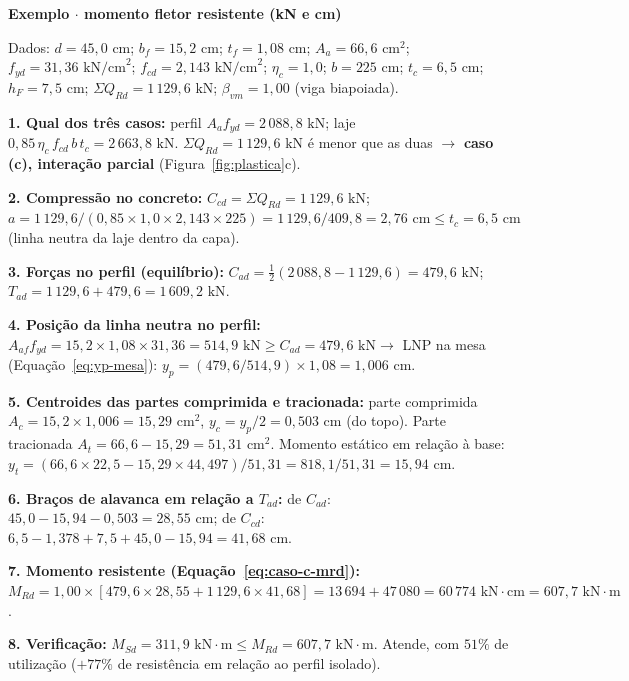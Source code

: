 \documentclass[11pt,a4paper]{article}
\newcommand{\caixaexemplo}[2]{%
  \par\vspace{6pt}\noindent\colorbox{examplebg}{%
    \parbox{\dimexpr\linewidth-2\fboxsep\relax}{%
      \vspace{4pt}\textbf{\color{exampleaccent}#1}\par\vspace{3pt}#2\vspace{4pt}%
    }%
  }\par\vspace{6pt}%
}
\begin{document}
\caixaexemplo{Exemplo $\cdot$ momento fletor resistente (kN e cm)}{%
Dados: $d = 45{,}0\text{ cm}$; $b_f = 15{,}2\text{ cm}$; $t_f = 1{,}08\text{ cm}$; $A_a = 66{,}6\text{ cm}^2$; $f_{yd} = 31{,}36\text{ kN/cm}^2$; $f_{cd} = 2{,}143\text{ kN/cm}^2$; $\eta_c = 1{,}0$; $b = 225\text{ cm}$; $t_c = 6{,}5\text{ cm}$; $h_F = 7{,}5\text{ cm}$; $\Sigma Q_{Rd} = 1\,129{,}6\text{ kN}$; $\beta_{vm} = 1{,}00$ (viga biapoiada).\par\vspace{3pt}
\textbf{1. Qual dos três casos:} perfil $A_a f_{yd} = 2\,088{,}8\text{ kN}$; laje $0{,}85\,\eta_c\,f_{cd}\,b\,t_c = 2\,663{,}8\text{ kN}$. $\Sigma Q_{Rd} = 1\,129{,}6\text{ kN}$ é menor que as duas $\rightarrow$ \textbf{caso (c), interação parcial} (Figura~\ref{fig:plastica}c).\par
\textbf{2. Compressão no concreto:} $C_{cd} = \Sigma Q_{Rd} = 1\,129{,}6\text{ kN}$; $a = 1\,129{,}6/(0{,}85 \times 1{,}0 \times 2{,}143 \times 225) = 1\,129{,}6/409{,}8 = 2{,}76\text{ cm} \le t_c = 6{,}5\text{ cm}$ (linha neutra da laje dentro da capa).\par
\textbf{3. Forças no perfil (equilíbrio):} $C_{ad} = \frac{1}{2}(2\,088{,}8 - 1\,129{,}6) = 479{,}6\text{ kN}$; $T_{ad} = 1\,129{,}6 + 479{,}6 = 1\,609{,}2\text{ kN}$.\par
\textbf{4. Posição da linha neutra no perfil:} $A_{af} f_{yd} = 15{,}2 \times 1{,}08 \times 31{,}36 = 514{,}9\text{ kN} \ge C_{ad} = 479{,}6\text{ kN} \rightarrow$ LNP na mesa (Equação~\ref{eq:yp-mesa}): $y_p = (479{,}6/514{,}9) \times 1{,}08 = 1{,}006\text{ cm}$.\par
\textbf{5. Centroides das partes comprimida e tracionada:} parte comprimida $A_c = 15{,}2 \times 1{,}006 = 15{,}29\text{ cm}^2$, $y_c = y_p/2 = 0{,}503\text{ cm}$ (do topo). Parte tracionada $A_t = 66{,}6 - 15{,}29 = 51{,}31\text{ cm}^2$. Momento estático em relação à base: $y_t = (66{,}6 \times 22{,}5 - 15{,}29 \times 44{,}497)/51{,}31 = 818{,}1/51{,}31 = 15{,}94\text{ cm}$.\par
\textbf{6. Braços de alavanca em relação a $T_{ad}$:} de $C_{ad}$: $45{,}0 - 15{,}94 - 0{,}503 = 28{,}55\text{ cm}$; de $C_{cd}$: $6{,}5 - 1{,}378 + 7{,}5 + 45{,}0 - 15{,}94 = 41{,}68\text{ cm}$.\par
\textbf{7. Momento resistente (Equação~\ref{eq:caso-c-mrd}):} $M_{Rd} = 1{,}00 \times [479{,}6 \times 28{,}55 + 1\,129{,}6 \times 41{,}68] = 13\,694 + 47\,080 = 60\,774\text{ kN}\cdot\text{cm} = 607{,}7\text{ kN}\cdot\text{m}$.\par
\textbf{8. Verificação:} $M_{Sd} = 311{,}9\text{ kN}\cdot\text{m} \le M_{Rd} = 607{,}7\text{ kN}\cdot\text{m}$. Atende, com $51\%$ de utilização ($+77\%$ de resistência em relação ao perfil isolado).}
\end{document}
